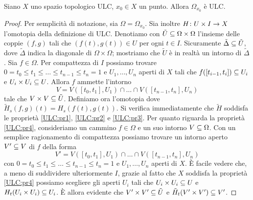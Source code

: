 \begin{proposition}
Siano \(X\) uno spazio topologico ULC, \(x_0\in X\) un punto. Allora \(\Omega_{x_0}\) è ULC.
\end{proposition}
\begin{proof}
Per semplicità di notazione, sia \(\Omega=\Omega_{x_0}\). Sia inoltre \(\map{H}{U\times I}{X}\) l'omotopia della definizione di ULC. Denotiamo con \(\tilde{U}\subseteq\Omega\times\Omega\) l'insieme delle coppie \((f,g)\) tali che \((f(t),g(t))\in U\) per ogni \(t\in I\). Sicuramente \(\tilde\Delta\subseteq\tilde U\), dove \(\tilde\Delta\) indica la diagonale di \(\Omega\times\Omega\); mostriamo che \(\tilde U\) è in realtà un intorno di \(\tilde\Delta\). Sia \(f\in\Omega\). Per compattezza di \(I\) possiamo trovare \(0=t_0\le t_1\le\ldots\le t_{n-1}\le t_n=1\) e \(U_1,\ldots,U_n\) aperti di \(X\) tali che \(f([t_{i-1},t_i])\subseteq U_i\) e \(U_i\times U_i\subseteq U\). Allora \(f\) ammette l'intorno
\[
V=V([t_0,t_1],U_1)\cap\ldots\cap V([t_{n-1},t_n],U_n)
\]
tale che \(V\times V\subseteq\tilde{U}\). Definiamo ora l'omotopia
dove \(\tilde{H}_s(f,g)(t)=H_s(f(t),g(t))\). Si verifica immediatamente che \(\tilde{H}\) soddisfa le proprietà \ref{ULC:pr1}, \ref{ULC:pr2} e \ref{ULC:pr3}. Per quanto riguarda la proprietà \ref{ULC:pr4}, consideriamo un cammino \(f\in\Omega\) e un suo intorno \(V\subseteq\Omega\).
Con un semplice ragionamento di compattezza possiamo trovare un intorno aperto \(V'\subseteq V\) di \(f\) della forma
\[
V'=V([t_0,t_1],U_1)\cap\ldots\cap V([t_{n-1},t_n],U_n)
\]
con \(0=t_0\le t_1\le\ldots\le t_{n-1}\le t_n=1\) e \(U_1,\ldots,U_n\) aperti di \(X\). È facile vedere che, a meno di suddividere ulteriormente \(I\), grazie al fatto che \(X\) soddisfa la proprietà \ref{ULC:pr4} possiamo scegliere gli aperti \(U_i\) tali che \(U_i\times U_i\subseteq U\) e \(H_t(U_i\times U_i)\subseteq U_i\). È allora evidente che \(V'\times V'\subseteq\tilde{U}\) e \(\tilde{H}_t(V'\times V')\subseteq V'\).
\end{proof}

